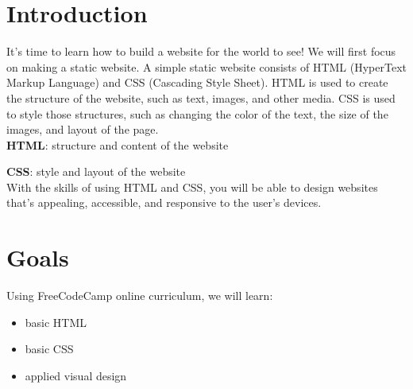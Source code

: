 \documentclass{42-en}
\begin{document}
\chapter{Introduction}

It's time to learn how to build a website for the world to see! We will first focus on making a static website. A simple static website consists of HTML (HyperText Markup Language) and CSS (Cascading Style Sheet). HTML is used to create the structure of the website, such as text, images, and other media. CSS is used to style those structures, such as changing the color of the text, the size of the images, and layout of the page.\\
    
\textbf{HTML}: structure and content of the website\par
\textbf{CSS}: style and layout of the website\\

With the skills of using HTML and CSS, you will be able to design websites that's appealing, accessible, and responsive to the user's devices.



\chapter{Goals}

Using FreeCodeCamp online curriculum, we will learn:
\begin{itemize}
    \item basic HTML
    \item basic CSS
    \item applied visual design
\end{itemize}
\end{document}
